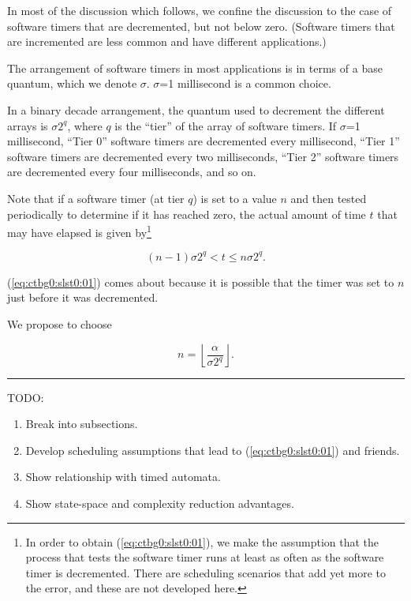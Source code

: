 In most of the discussion which follows, we confine the discussion to
the case of software timers that are decremented, but not below zero.
(Software timers that are incremented are less common and have different
applications.)

The arrangement of software timers in most applications is in terms of
a base quantum, which we denote $\sigma$\@.  $\sigma$=1 millisecond is
a common choice.

In a binary decade arrangement, the quantum used to decrement the
different arrays is $\sigma 2^q$, where $q$ is the ``tier'' of the array of
software timers.  If $\sigma$=1 millisecond, ``Tier 0'' software timers
are decremented every millisecond, ``Tier 1'' software timers are decremented
every two milliseconds, ``Tier 2'' software timers are decremented
every four milliseconds, and so on.

Note that if a software timer (at tier $q$) is set to a value $n$
and then tested periodically to determine if it has reached zero, the
actual amount of time $t$ that may have elapsed is given by\footnote{In
order to obtain (\ref{eq:ctbg0:slst0:01}), we make the assumption that
the process that tests the software timer runs at least as often as the
software timer is decremented.  There are scheduling scenarios that add
yet more to the error, and these are not developed here.}

\begin{equation}
\label{eq:ctbg0:slst0:01}
(n - 1) \sigma 2^q 
<
t
\leq
n \sigma 2^q .
\end{equation}

\noindent{}(\ref{eq:ctbg0:slst0:01}) comes about because it is possible
that the timer was set to $n$ just before it was decremented.

We propose to choose

\begin{equation}
\label{eq:ctbg0:slst0:02}
n = \left\lfloor {\frac{\alpha}{\sigma 2^q}} \right\rfloor .
\end{equation}

\noindent\rule{\textwidth}{2pt}

TODO:

\begin{enumerate}
\item Break into subsections.
\item Develop scheduling assumptions that lead to (\ref{eq:ctbg0:slst0:01}) and friends.
\item Show relationship with timed automata.
\item Show state-space and complexity reduction advantages.
\end{enumerate}


